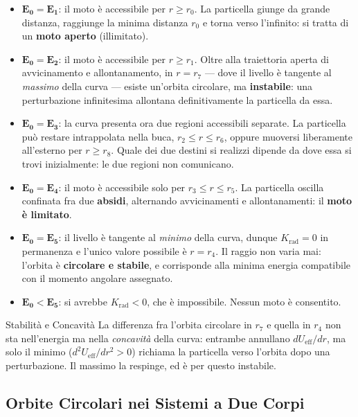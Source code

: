 \begin{itemize}
    \item $\mathbf{E_0 = E_1}$: il moto è accessibile per $r \geq r_0$. La particella giunge da grande distanza, raggiunge la minima distanza $r_0$ e torna verso l'infinito: si tratta di un \textbf{moto aperto} (illimitato).
    \item $\mathbf{E_0 = E_2}$: il moto è accessibile per $r \geq r_1$. Oltre alla traiettoria aperta di avvicinamento e allontanamento, in $r = r_7$ --- dove il livello è tangente al \emph{massimo} della curva --- esiste un'orbita circolare, ma \textbf{instabile}: una perturbazione infinitesima allontana definitivamente la particella da essa.
    \item $\mathbf{E_0 = E_3}$: la curva presenta ora due regioni accessibili separate. La particella può restare intrappolata nella buca, $r_2 \leq r \leq r_6$, oppure muoversi liberamente all'esterno per $r \geq r_8$. Quale dei due destini si realizzi dipende da dove essa si trovi inizialmente: le due regioni non comunicano.
    \item $\mathbf{E_0 = E_4}$: il moto è accessibile solo per $r_3 \leq r \leq r_5$. La particella oscilla confinata fra due \textbf{absidi}, alternando avvicinamenti e allontanamenti: il \textbf{moto è limitato}.
    \item $\mathbf{E_0 = E_5}$: il livello è tangente al \emph{minimo} della curva, dunque $K_{\text{rad}} = 0$ in permanenza e l'unico valore possibile è $r = r_4$. Il raggio non varia mai: l'orbita è \textbf{circolare e stabile}, e corrisponde alla minima energia compatibile con il momento angolare assegnato.
    \item $\mathbf{E_0 < E_5}$: si avrebbe $K_{\text{rad}} < 0$, che è impossibile. Nessun moto è consentito.
\end{itemize}

\begin{osservazione}{Stabilità e Concavità}
La differenza fra l'orbita circolare in $r_7$ e quella in $r_4$ non sta nell'energia ma nella \emph{concavità} della curva: entrambe annullano $dU_{\text{eff}}/dr$, ma solo il minimo ($d^2U_{\text{eff}}/dr^2 > 0$) richiama la particella verso l'orbita dopo una perturbazione. Il massimo la respinge, ed è per questo instabile.
\end{osservazione}

\subsection{Orbite Circolari nei Sistemi a Due Corpi}

